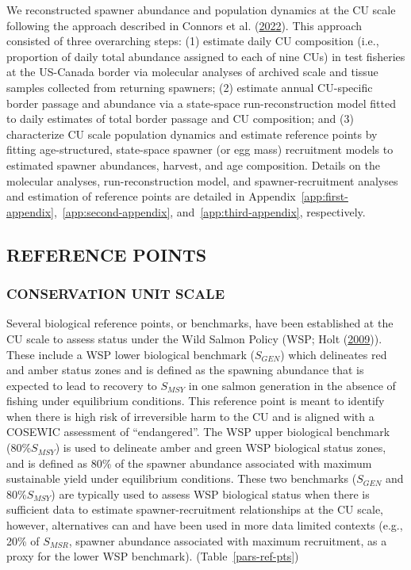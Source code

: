 \documentclass[11pt]{book}
\begin{document}
We reconstructed spawner abundance and population dynamics at the CU scale following the approach described in Connors et al. (\protect\hyperlink{ref-connors2022}{2022}). This approach consisted of three overarching steps: (1) estimate daily CU composition (i.e., proportion of daily total abundance assigned to each of nine CUs) in test fisheries at the US-Canada border via molecular analyses of archived scale and tissue samples collected from returning spawners; (2) estimate annual CU-specific border passage and abundance via a state-space run-reconstruction model fitted to daily estimates of total border passage and CU composition; and (3) characterize CU scale population dynamics and estimate reference points by fitting age-structured, state-space spawner (or egg mass) recruitment models to estimated spawner abundances, harvest, and age composition. Details on the molecular analyses, run-reconstruction model, and spawner-recruitment analyses and estimation of reference points are detailed in Appendix~\ref{app:first-appendix},~\ref{app:second-appendix}, and~\ref{app:third-appendix}, respectively.

\hypertarget{reference-points}{%
\subsection{REFERENCE POINTS}\label{reference-points}}

\hypertarget{conservation-unit-scale}{%
\subsubsection{CONSERVATION UNIT SCALE}\label{conservation-unit-scale}}

Several biological reference points, or benchmarks, have been established at the CU scale to assess status under the Wild Salmon Policy (WSP; Holt (\protect\hyperlink{ref-holtEvaluationBenchmarksConservation2009}{2009})). These include a WSP lower biological benchmark (\(S_{GEN}\)) which delineates red and amber status zones and is defined as the spawning abundance that is expected to lead to recovery to \(S_{MSY}\) in one salmon generation in the absence of fishing under equilibrium conditions. This reference point is meant to identify when there is high risk of irreversible harm to the CU and is aligned with a COSEWIC assessment of ``endangered''. The WSP upper biological benchmark (80\%\(S_{MSY}\)) is used to delineate amber and green WSP biological status zones, and is defined as 80\% of the spawner abundance associated with maximum sustainable yield under equilibrium conditions. These two benchmarks (\(S_{GEN}\) and 80\%\(S_{MSY}\)) are typically used to assess WSP biological status when there is sufficient data to estimate spawner-recruitment relationships at the CU scale, however, alternatives can and have been used in more data limited contexts (e.g., 20\% of \(S_{MSR}\), spawner abundance associated with maximum recruitment, as a proxy for the lower WSP benchmark). (Table~\ref{pars-ref-pts})
\end{document}
